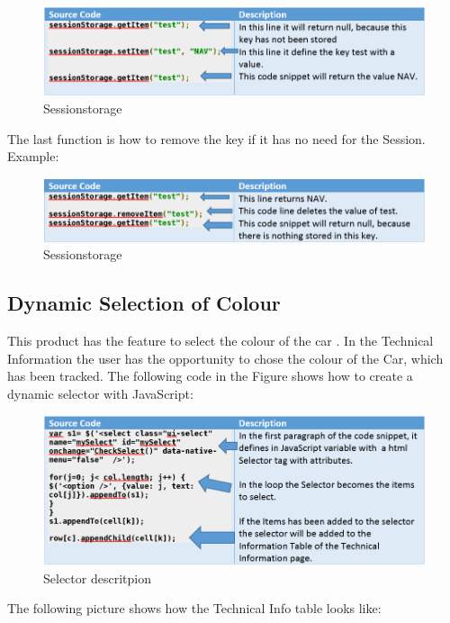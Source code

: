 \begin{figure}[h]
\centering
\includegraphics[width=1.0\linewidth]{graphics/sessionstorage2.PNG}
\caption{Sessionstorage}
\end{figure}

The last function is how to remove the key if it has no need for the Session. Example:
\begin{figure}[h]
\centering
\includegraphics[width=1.0\linewidth]{graphics/sessionstorage3.PNG}
\caption{Sessionstorage}
\end{figure}

\subsection{Dynamic Selection of Colour}
This product has the feature to select the colour of the car . In the Technical Information the user has the opportunity to chose the colour of the Car, which has been tracked. The following code in the Figure shows how to create a dynamic selector with JavaScript:

\begin{figure}[h]
\centering
\includegraphics[width=1.0\linewidth]{graphics/Sessionstorage41.PNG}
\caption{Selector descritpion}
\end{figure}

The following picture shows how the Technical Info table looks like:

